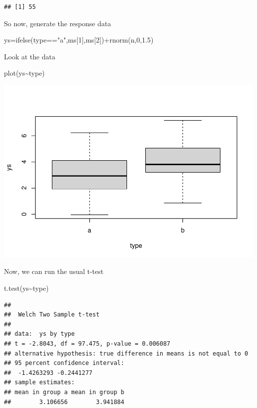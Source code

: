 \documentclass[
]{book}
\newenvironment{Shaded}{\begin{snugshade}}{\end{snugshade}}
\newcommand{\DecValTok}[1]{\textcolor[rgb]{0.00,0.00,0.81}{#1}}
\newcommand{\FloatTok}[1]{\textcolor[rgb]{0.00,0.00,0.81}{#1}}
\newcommand{\FunctionTok}[1]{\textcolor[rgb]{0.00,0.00,0.00}{#1}}
\newcommand{\NormalTok}[1]{#1}
\newcommand{\OtherTok}[1]{\textcolor[rgb]{0.56,0.35,0.01}{#1}}
\newcommand{\SpecialCharTok}[1]{\textcolor[rgb]{0.00,0.00,0.00}{#1}}
\newcommand{\StringTok}[1]{\textcolor[rgb]{0.31,0.60,0.02}{#1}}
\begin{document}
\begin{verbatim}
## [1] 55
\end{verbatim}

So now, generate the response data

\begin{Shaded}
\begin{Highlighting}[]
\NormalTok{ys}\OtherTok{=}\FunctionTok{ifelse}\NormalTok{(type}\SpecialCharTok{==}\StringTok{"a"}\NormalTok{,ms[}\DecValTok{1}\NormalTok{],ms[}\DecValTok{2}\NormalTok{])}\SpecialCharTok{+}\FunctionTok{rnorm}\NormalTok{(n,}\DecValTok{0}\NormalTok{,}\FloatTok{1.5}\NormalTok{)}
\end{Highlighting}
\end{Shaded}

Look at the data

\begin{Shaded}
\begin{Highlighting}[]
\FunctionTok{plot}\NormalTok{(ys}\SpecialCharTok{\textasciitilde{}}\NormalTok{type)}
\end{Highlighting}
\end{Shaded}

\includegraphics{ECOMODbook_files/figure-latex/a8.7-1.pdf}

Now, we can run the usual t-test

\begin{Shaded}
\begin{Highlighting}[]
\FunctionTok{t.test}\NormalTok{(ys}\SpecialCharTok{\textasciitilde{}}\NormalTok{type)}
\end{Highlighting}
\end{Shaded}

\begin{verbatim}
## 
##  Welch Two Sample t-test
## 
## data:  ys by type
## t = -2.8043, df = 97.475, p-value = 0.006087
## alternative hypothesis: true difference in means is not equal to 0
## 95 percent confidence interval:
##  -1.4263293 -0.2441277
## sample estimates:
## mean in group a mean in group b 
##        3.106656        3.941884
\end{verbatim}
\end{document}
